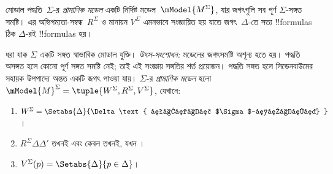 \documentclass[../../../include/open-logic-section]{subfiles}
\begin{document}


মোডাল পদ্ধতি~$\Sigma$-র \emph{প্রামাণিক মডেল} একটি নির্দিষ্ট মডেল~$\mModel{M^\Sigma}$, যার জগৎগুলি সব পূর্ণ $\Sigma$-সঙ্গত সমষ্টি। এর অভিগম্যতা-সম্বন্ধ~$R^\Sigma$ ও মানায়ন $V^\Sigma$ এমনভাবে সংজ্ঞায়িত হয় যাতে জগৎ~$\Delta$-তে সত্য !!{formula}s ঠিক $\Delta$-রই !!{formula}s হয়।

\begin{defn}
  ধরা যাক $\Sigma$ একটি সঙ্গত স্বাভাবিক মোডাল যুক্তি।
  \emph{উৎস-সংশোধন:} মডেলের জগৎসমষ্টি অশূন্য হতে হয়। পদ্ধতি অসঙ্গত হলে কোনো পূর্ণ সঙ্গত সমষ্টি নেই; তাই এই সংজ্ঞায় সঙ্গতির শর্ত প্রয়োজন। পদ্ধতি সঙ্গত হলে লিন্ডেনবাউমের সহায়ক উপপাদ্যে অন্তত একটি জগৎ পাওয়া যায়।
  $\Sigma$-র \emph{প্রামাণিক মডেল} হলো $\mModel{M}^\Sigma = \tuple{W^\Sigma, R^\Sigma,
    V^\Sigma}$, যেখানে:
  \begin{enumerate}
  \item $W^\Sigma = \Setabs{ \Delta }{\Delta \text{
      পূর্ণ $\Sigma$-সঙ্গত} }$।
  \item $R^\Sigma \Delta\Delta'$ তখনই এবং কেবল তখনই, যখন
    ।
  \item $V^\Sigma(p) = \Setabs{\Delta}{p \in \Delta}$।
  \end{enumerate}
\end{defn}
\end{document}
